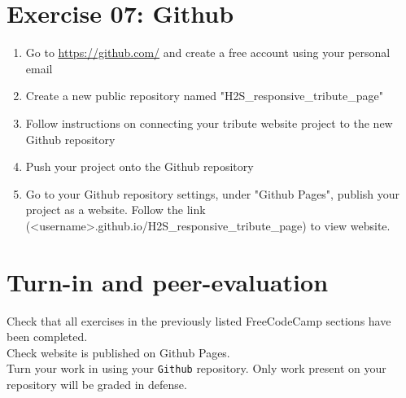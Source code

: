 \documentclass{42-en}
\begin{document}
\chapter{Exercise 07: Github}

\exnumber{\exercicenumber}

\makeheaderfiles

\begin{enumerate}
    \item Go to \url{https://github.com/} and create a free account using your personal email
    \item Create a new public repository named "H2S\_responsive\_tribute\_page"
    \item Follow instructions on connecting your tribute website project to the new Github repository
    \item Push your project onto the Github repository
    \item Go to your Github repository settings, under "Github Pages", publish your project as a website. Follow the link (<username>.github.io/H2S\_responsive\_tribute\_page) to view website.
\end{enumerate}

\chapter{Turn-in and peer-evaluation}

    Check that all exercises in the previously listed FreeCodeCamp sections have been completed.\\
    
    Check website is published on Github Pages.\\

    Turn your work in using your \texttt{Github} repository. Only work present on your repository will be graded in defense.

\end{document}
